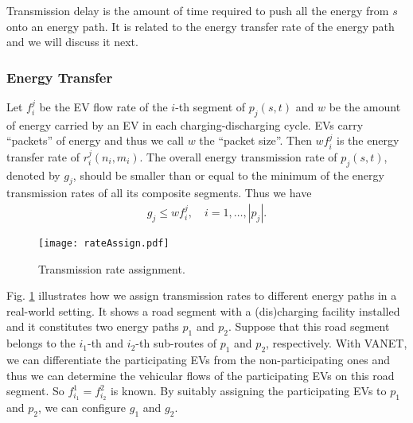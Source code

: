 \documentclass[journal]{IEEEtran}
\begin{document}
Transmission delay is the amount of time required to push all the energy from $s$ onto an energy path. It is related to the energy transfer rate of the energy path and we will discuss it next.

\subsubsection{Energy Transfer}
Let $f_i^j$ be the EV flow rate of the $i$-th segment of $p_j(s,t)$ and $w$ be the amount of energy carried by an EV in each charging-discharging cycle. EVs carry ``packets'' of energy and thus we call $w$ the ``packet size''. Then $w f_i^j$ is the energy transfer rate of $r_{i}^j(n_i,m_i)$. The overall energy transmission rate of $p_j(s,t)$, denoted by $g_j$, should be smaller than or equal to the minimum of the energy transmission rates of all its composite segments. Thus we have
\begin{align}
	g_j\leq wf_i^j, \quad i=1,\ldots,|p_j|. \label{transferRate}
\end{align}
\begin{figure}[!t]
\texttt{[image: rateAssign.pdf]}
\caption{Transmission rate assignment.}
\label{fig:rateAssign}
\end{figure}
Fig. \ref{fig:rateAssign} illustrates how we assign transmission rates to different energy paths in a real-world setting. It shows a road segment with a (dis)charging facility installed and it constitutes two energy paths $p_1$ and $p_2$. Suppose that this road segment belongs to the $i_1$-th and $i_2$-th sub-routes of $p_1$ and $p_2$, respectively. With VANET, we can differentiate the participating EVs from the non-participating ones and thus we can determine the vehicular flows of the participating EVs on this road segment. So $f_{i_1}^1=f_{i_2}^2$ is known. By suitably assigning the participating EVs to $p_1$ and $p_2$, we can configure $g_1$ and $g_2$.
\end{document}
